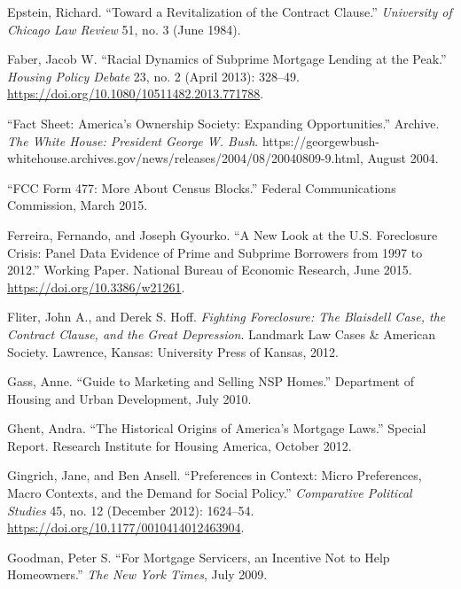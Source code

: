 \documentclass[12pt,oneside]{psthesis}
\begin{document}
\leavevmode\hypertarget{ref-epstein1984revitalization}{}%
Epstein, Richard. ``Toward a Revitalization of the Contract Clause.'' \emph{University of Chicago Law Review} 51, no. 3 (June 1984).

\leavevmode\hypertarget{ref-faber2013racial}{}%
Faber, Jacob W. ``Racial Dynamics of Subprime Mortgage Lending at the Peak.'' \emph{Housing Policy Debate} 23, no. 2 (April 2013): 328--49. \url{https://doi.org/10.1080/10511482.2013.771788}.

\leavevmode\hypertarget{ref-2004fact}{}%
``Fact Sheet: America's Ownership Society: Expanding Opportunities.'' Archive. \emph{The White House: President George W. Bush}. https://georgewbush-whitehouse.archives.gov/news/releases/2004/08/20040809-9.html, August 2004.

\leavevmode\hypertarget{ref-2015fcc}{}%
``FCC Form 477: More About Census Blocks.'' Federal Communications Commission, March 2015.

\leavevmode\hypertarget{ref-ferreira2015new}{}%
Ferreira, Fernando, and Joseph Gyourko. ``A New Look at the U.S. Foreclosure Crisis: Panel Data Evidence of Prime and Subprime Borrowers from 1997 to 2012.'' Working Paper. National Bureau of Economic Research, June 2015. \url{https://doi.org/10.3386/w21261}.

\leavevmode\hypertarget{ref-fliter2012fighting}{}%
Fliter, John A., and Derek S. Hoff. \emph{Fighting Foreclosure: The Blaisdell Case, the Contract Clause, and the Great Depression}. Landmark Law Cases \& American Society. Lawrence, Kansas: University Press of Kansas, 2012.

\leavevmode\hypertarget{ref-gass2010guide}{}%
Gass, Anne. ``Guide to Marketing and Selling NSP Homes.'' Department of Housing and Urban Development, July 2010.

\leavevmode\hypertarget{ref-ghent2012historical}{}%
Ghent, Andra. ``The Historical Origins of America's Mortgage Laws.'' Special Report. Research Institute for Housing America, October 2012.

\leavevmode\hypertarget{ref-gingrich2012preferences}{}%
Gingrich, Jane, and Ben Ansell. ``Preferences in Context: Micro Preferences, Macro Contexts, and the Demand for Social Policy.'' \emph{Comparative Political Studies} 45, no. 12 (December 2012): 1624--54. \url{https://doi.org/10.1177/0010414012463904}.

\leavevmode\hypertarget{ref-goodman2009mortgage}{}%
Goodman, Peter S. ``For Mortgage Servicers, an Incentive Not to Help Homeowners.'' \emph{The New York Times}, July 2009.
\end{document}
